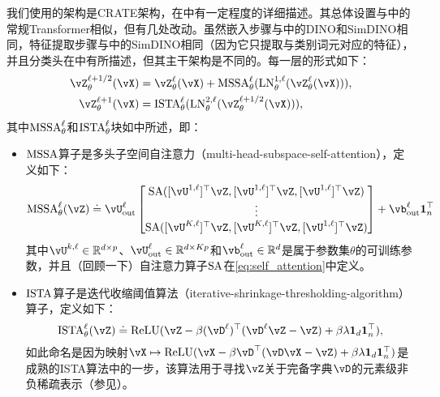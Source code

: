 \documentclass[../../book-main_zh.tex]{subfiles}
\begin{document}
我们使用的架构是CRATE架构，在中有一定程度的详细描述。其总体设置与中的常规Transformer相似，但有几处改动。虽然嵌入步骤与中的DINO和SimDINO相同，特征提取步骤与中的SimDINO相同（因为它只提取与类别词元对应的特征），并且分类头在中有所描述，但其主干架构是不同的。每一层的形式如下：
\begin{align}\label{eq:CARTE updates}
    \vZ_{\theta}^{\ell + 1/2}(\vX)
    &= \vZ_{\theta}^{\ell}(\vX) + \MSSA_{\theta}^{\ell}(\LN_{\theta}^{1, \ell}(\vZ_{\theta}^{\ell}(\vX))), \\ 
    \vZ_{\theta}^{\ell + 1}(\vX)
    &= \ISTA_{\theta}^{\ell}(\LN_{\theta}^{2, \ell}(\vZ_{\theta}^{\ell + 1/2}(\vX))),
\end{align}
其中\(\operatorname{MSSA}_{\theta}^{\ell}\)和\(\operatorname{ISTA}_{\theta}^{\ell}\)块如中所述，即：
\begin{itemize}
    \item \(\operatorname{MSSA}\)算子是多头子空间自注意力（multi-head-subspace-self-attention），定义如下：
    \begin{equation}
        \MSSA_{\theta}^{\ell}(\vZ) \doteq \vU_{\out}^{\ell}\mat{\SA([\vU^{1, \ell}]^{\top}\vZ, [\vU^{1, \ell}]^{\top}\vZ, [\vU^{1, \ell}]^{\top}\vZ)\\ \vdots \\ \SA([\vU^{K, \ell}]^{\top}\vZ, [\vU^{K, \ell}]^{\top}\vZ, [\vU^{1, \ell}]^{\top}\vZ)} + \vb_{\out}^{\ell}\vone_{n}^{\top}
    \end{equation}
    其中\(\vU^{k, \ell} \in \R^{d \times p}\)、\(\vU_{\out}^{\ell} \in \R^{d \times Kp}\)和\(\vb_{\out}^{\ell} \in \R^{d}\)是属于参数集\(\theta\)的可训练参数，并且（回顾一下）自注意力算子\(\operatorname{SA}\)在\eqref{eq:self_attention}中定义。
    \item \(\operatorname{ISTA}\)算子是迭代收缩阈值算法（iterative-shrinkage-thresholding-algorithm）算子，定义如下：
    \begin{equation}
        \ISTA_{\theta}^{\ell}(\vZ) \doteq \ReLU(\vZ - \beta (\vD^{\ell})^{\top}(\vD^{\ell}\vZ - \vZ) + \beta\lambda \vone_{d}\vone_{n}^{\top}),
    \end{equation}
    如此命名是因为映射\(\vX \mapsto \ReLU(\vX - \beta \vD^{\top}(\vD\vX - \vZ) + \beta  \lambda \vone_{d}\vone_{n}^{\top})\)是成熟的ISTA算法中的一步，该算法用于寻找\(\vZ\)关于完备字典\(\vD\)的元素级非负稀疏表示（参见）。
\end{itemize}
\end{document}
